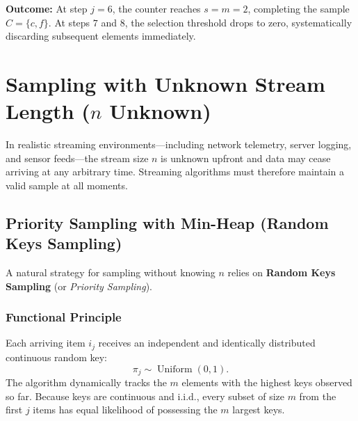 \begin{example}
\textbf{Outcome:} At step $j = 6$, the counter reaches $s = m = 2$, completing the sample $C = \{c, f\}$. At steps $7$ and $8$, the selection threshold drops to zero, systematically discarding subsequent elements immediately.
\end{example}

\FloatBarrier
\section{Sampling with Unknown Stream Length (\texorpdfstring{$n$}{n} Unknown)}
\label{sec:sampling-unknown-n}

In realistic streaming environments—including network telemetry, server logging, and sensor feeds—the stream size $n$ is unknown upfront and data may cease arriving at any arbitrary time. Streaming algorithms must therefore maintain a valid sample at all moments.

\subsection{Priority Sampling with Min-Heap (Random Keys Sampling)}
A natural strategy for sampling without knowing $n$ relies on \textbf{Random Keys Sampling} (or \textit{Priority Sampling}).

\subsubsection{Functional Principle}
Each arriving item $i_j$ receives an independent and identically distributed continuous random key:
\begin{equation}
  \pi_j \sim \operatorname{Uniform}(0, 1).
\end{equation}
The algorithm dynamically tracks the $m$ elements with the highest keys observed so far. Because keys are continuous and i.i.d., every subset of size $m$ from the first $j$ items has equal likelihood of possessing the $m$ largest keys.

